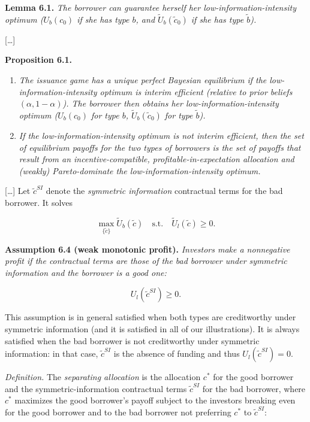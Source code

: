 \documentclass[11pt,a4paper]{article}
\begin{document}
\textbf{Lemma 6.1.} \emph{The borrower can guarantee herself her low-information-intensity optimum
(\(U_b(c_0)\) if she has type \(b\), and \(\tilde{U}_b(\tilde{c}_0)\) if she has type
\(\tilde{b}\)).}

{[}\ldots{]}

\textbf{Proposition 6.1.}

\begin{enumerate}
\def\labelenumi{(\alph{enumi})}
\item
  \emph{The issuance game has a unique perfect Bayesian equilibrium if the low-information-intensity
  optimum is interim efficient (relative to prior beliefs \((\alpha, 1 - \alpha)\)). The borrower
  then obtains her low-information-intensity optimum (\(U_b(c_0)\) for type \(b\),
  \(\tilde{U}_b(\tilde{c}_0)\) for type \(\tilde{b}\)).}
\item
  \emph{If the low-information-intensity optimum is not interim efficient, then the set of
  equilibrium payoffs for the two types of borrowers is the set of payoffs that result from an
  incentive-compatible, profitable-in-expectation allocation and (weakly) Pareto-dominate the
  low-information-intensity optimum.}
\end{enumerate}

{[}\ldots{]} Let \(\tilde{c}^{SI}\) denote the \emph{symmetric information} contractual terms for
the bad borrower. It solves

\[\max_{\{\tilde{c}\}} \tilde{U}_b(\tilde{c}) \quad \text{s.t.} \quad \tilde{U}_l(\tilde{c}) \geqslant 0.\]

\textbf{Assumption 6.4 (weak monotonic profit).} \emph{Investors make a nonnegative profit if the
contractual terms are those of the bad borrower under symmetric information and the borrower is a
good one:}

\[U_l(\tilde{c}^{SI}) \geqslant 0.\]

This assumption is in general satisfied when both types are creditworthy under symmetric information
(and it is satisfied in all of our illustrations). It is always satisfied when the bad borrower is
not creditworthy under symmetric information: in that case, \(\tilde{c}^{SI}\) is the absence of
funding and thus \(U_l(\tilde{c}^{SI}) = 0\).

\emph{Definition.} The \emph{separating allocation} is the allocation \(c^*\) for the good borrower
and the symmetric-information contractual terms \(\tilde{c}^{SI}\) for the bad borrower, where
\(c^*\) maximizes the good borrower's payoff subject to the investors breaking even for the good
borrower and to the bad borrower not preferring \(c^*\) to \(\tilde{c}^{SI}\):
\end{document}
